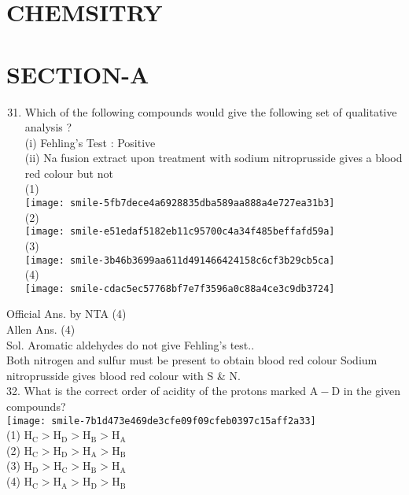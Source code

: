 \documentclass[10pt]{article}
\begin{document}
\captionsetup{singlelinecheck=false}
\section*{CHEMSITRY}
\section*{SECTION-A}
\begin{enumerate}
  \setcounter{enumi}{30}
  \item Which of the following compounds would give the following set of qualitative analysis ?\\
(i) Fehling's Test : Positive\\
(ii) Na fusion extract upon treatment with sodium nitroprusside gives a blood red colour but not\\
(1)\\
\texttt{[image: smile-5fb7dece4a6928835dba589aa888a4e727ea31b3]}\\
(2)\\
\texttt{[image: smile-e51edaf5182eb11c95700c4a34f485beffafd59a]}\\
(3)\\
\texttt{[image: smile-3b46b3699aa611d491466424158c6cf3b29cb5ca]}\\
(4)\\
\texttt{[image: smile-cdac5ec57768bf7e7f3596a0c88a4ce3c9db3724]}
\end{enumerate}

Official Ans. by NTA (4)\\
Allen Ans. (4)\\
Sol. Aromatic aldehydes do not give Fehling's test..\\
Both nitrogen and sulfur must be present to obtain blood red colour Sodium nitroprusside gives blood red colour with S \& N.\\
32. What is the correct order of acidity of the protons marked \(\mathrm{A}-\mathrm{D}\) in the given compounds?\\
\texttt{[image: smile-7b1d473e469de3cfe09f09cfeb0397c15aff2a33]}\\
(1) \(\mathrm{H}_{\mathrm{C}}>\mathrm{H}_{\mathrm{D}}>\mathrm{H}_{\mathrm{B}}>\mathrm{H}_{\mathrm{A}}\)\\
(2) \(\mathrm{H}_{\mathrm{C}}>\mathrm{H}_{\mathrm{D}}>\mathrm{H}_{\mathrm{A}}>\mathrm{H}_{\mathrm{B}}\)\\
(3) \(\mathrm{H}_{\mathrm{D}}>\mathrm{H}_{\mathrm{C}}>\mathrm{H}_{\mathrm{B}}>\mathrm{H}_{\mathrm{A}}\)\\
(4) \(\mathrm{H}_{\mathrm{C}}>\mathrm{H}_{\mathrm{A}}>\mathrm{H}_{\mathrm{D}}>\mathrm{H}_{\mathrm{B}}\)
\end{document}
